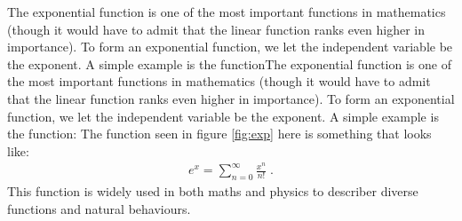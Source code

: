 \documentclass{article}
\begin{document}
The exponential function is one of the most important functions in mathematics (though it would have to admit that the linear function ranks even higher in importance). To form an exponential function, we let the independent variable be the exponent. A simple example is the functionThe exponential function is one of the most important functions in mathematics (though it would have to admit that the linear function ranks even higher in importance). To form an exponential function, we let the independent variable be the exponent. A simple example is the function:
The function seen in figure \ref{fig:exp} here is something that looks like: 
\begin{align}
e^x=\sum^{\infty}_{n=0} \frac{x^n}{n!} \label{Taylor_exp} \; . 
\end{align}
This function is widely used in both maths and physics to describer diverse functions and natural behaviours. 
\end{document}

